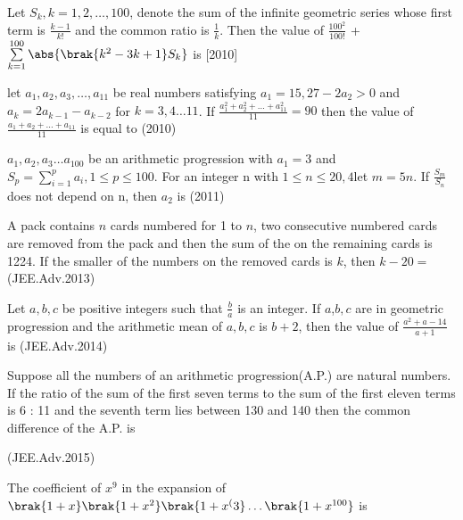 \iffalse
\title{Assignment1}
\author{DULLA KARTHIK}
\section{integer}
\fi




\item Let $S_{k}, k = 1,2, \dots , 100$, denote the sum of the infinite geometric series whose first term is  $\frac{k - 1}{k!}$ and the common ratio is $\frac{1}{k}$. Then the value of $\frac{100^{2}}{100!}$ + $\sum\limits_{k=1}^{100} \abs{\brak{k^{2} - 3k +1}S_{k}} $ is \hfill[2010]

\item let $a_{1},a_{2},a_{3},\dots , a_{11}$ be real numbers satisfying $a_{1}= 15, 27 - 2a_{2} > 0$ and $a_{k}=2a_{k-1} - a_{k-2}$ for $k=3,4 \dots 11$. If $\frac{a_{1}^{2} + a_{2}^{2} + \dots +a_{11}^{2}}{11} = 90$ then the value of $\frac{a_{1} + a_{2} +\dots +a_{11}}{11}$ is equal to \hfill(2010)

\item $a_{1}, a_{2}, a_{3}\dots a_{100}$ be an arithmetic progression with $a_{1}= 3$ and $S_{p} =\sum\limits_{i=1}^{p} a_{i},1\leq p\leq 100$. For an integer n with $1 \leq n \leq 20,4$let $m= 5n$. If $\frac{S_{m}}{S_{n}}$ does not depend on n, then $a_{2}$ is \hfill(2011)

   \item A pack contains $n$ cards numbered for 1 to $n$, two consecutive numbered cards are removed from the pack and then the sum of the on the remaining cards is 1224. If the smaller of the numbers on the removed cards is $k$, then $k - 20=$ \hfill(JEE.Adv.2013)

   \item Let $a,b,c$ be positive integers such that $\frac{b}{a}$ is an integer. If $a$,$b,c$ are in geometric progression and the arithmetic mean of $a,b,c$ is $b + 2$, then the value of $\frac{a^{2} + a - 14}{a + 1}$ is \hfill(JEE.Adv.2014)

   \item Suppose all the numbers of an arithmetic progression(A.P.) are natural numbers. If the ratio of the sum of the first seven terms to the sum of the first eleven terms is 6 : 11 and the seventh term lies between 130 and 140 then the common difference of the A.P. is 
   
    \hfill(JEE.Adv.2015)

   \item The coefficient of $x^{9}$ in the expansion of $\brak{1+x}\brak{1+x^{2}}\brak{1+x^({3}} \dots \brak{1+x^{100}} $ is 
   
